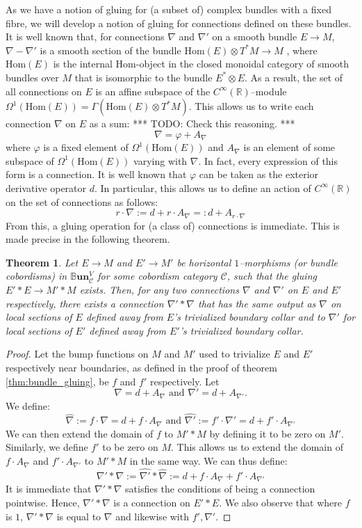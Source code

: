 \documentclass{amsart}
\newcommand{\R}{\mathbb{R}}
\newcommand{\s}{\mathscr}
\newcommand{\wh}{\widehat}
\newcommand{\tensor}{\otimes}
\renewcommand{\to}[1][]{\stackrel{#1}{\longrightarrow}}
\newcommand{\Hom}{\text{Hom}}
\newcommand{\BBun}{\mathbb{B}\textbf{un}}
\newcommand{\Cinf}{C^{\infty}}
\newcommand{\TODO}[1]{{\color{blue!55!black} *** TODO: #1 ***}}
\newtheorem{thm}{Theorem}
\numberwithin{thm}{section}
\theoremstyle{definition}
\begin{document}
As we have a notion of gluing for (a subset of) complex bundles with a fixed
fibre, we will develop a notion of gluing for connections defined on these
bundles. It is well known that, for connections $\nabla$ and $\nabla'$ on a
smooth bundle $E \to M$, $\nabla - \nabla'$ is a smooth section of the bundle
$\Hom(E) \tensor T^*M \to M$ \cite[Lemma 2.2]{Conn},
where $\Hom(E)$ is the internal $\Hom$-object in
the closed monoidal category of smooth bundles over $M$ that is isomorphic to
the bundle $E^* \tensor E$. As a result, the set of all
connections on $E$ is an affine subspace of the $\Cinf(\R)$--module
$\Omega^1(\Hom(E)) = \Gamma(\Hom(E) \tensor T^*M)$. This allows us to write each
connection $\nabla$ on $E$ as a sum:
\TODO{Check this reasoning.}
\[
  \nabla = \varphi + A_{\nabla}
\]
where $\varphi$ is a fixed element of $\Omega^1(\Hom(E))$ and $A_{\nabla}$
is an element of some subspace of $\Omega^1(\Hom(E))$ varying with $\nabla$. In
fact, every expression of this form is a connection. It is well known that
$\varphi$ can be taken as the exterior derivative operator $d$. In particular,
this allows us to define an action of $\Cinf(\R)$ on the set of connections as
follows:
\[
  r \cdot \nabla := d + r \cdot A_{\nabla} =: d + A_{r \cdot \nabla}
\]
From this, a gluing operation for (a class of) connections is immediate. This
is made precise in the following theorem.

\begin{thm}
Let $E \to M$ and $E' \to M'$ be horizontal $1$--morphisms
(or bundle cobordisms) in $\BBun^V_{\s{C}}$ for some cobordism category $\s{C}$,
such that the gluing $E' * E \to M' * M$ exists. Then, for any two connections
$\nabla$ and $\nabla'$ on $E$ and $E'$ respectively, there exists a connection
$\nabla' * \nabla$ that has the same output as $\nabla$ on local sections of $E$
defined away from $E$'s trivialized boundary collar and to $\nabla'$ for local
sections of $E'$ defined away from $E'$'s trivialized boundary collar.
\end{thm}
\begin{proof}
Let the bump functions on $M$ and $M'$ used to trivialize $E$ and $E'$
respectively near boundaries, as defined in the proof of theorem
\ref{thm:bundle_gluing}, be $f$ and $f'$ respectively. Let
\[
  \nabla = d + A_{\nabla} \text{ and } \nabla' = d + A_{\nabla'}.
\]
We define:
\[
  \wh{\nabla} := f \cdot \nabla = d + f \cdot A_{\nabla}
  \text{ and } \wh{\nabla'} := f' \cdot \nabla' = d + f' \cdot A_{\nabla'}
\]
We can then extend the domain of $f$ to $M' * M$ by defining it to be zero on
$M'$. Similarly, we define $f'$ to be zero on $M$. This allows us to extend the
domain of $f \cdot A_{\nabla}$ and $f' \cdot A_{\nabla'}$ to $M' * M$ in the
same way. We can thus define:
\[
  \nabla' * \nabla := \wh{\nabla'} * \wh{\nabla}
    := d + f \cdot A_{\nabla} + f' \cdot A_{\nabla'}
\]
It is immediate that $\nabla' * \nabla$ satisfies the conditions of being a
connection pointwise. Hence, $\nabla' * \nabla$ is a connection on $E' * E$. We
also observe that where $f$ is $1$, $\nabla' * \nabla$ is equal to $\nabla$ and
likewise with $f', \nabla'$.
\end{proof}
\end{document}
